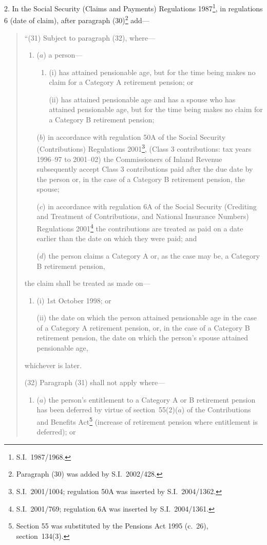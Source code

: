\documentclass[12pt,a4paper]{article}
\begin{document}
2.  In the Social Security (Claims and Payments) Regulations 1987\footnote{S.I.~1987/1968.}, in regulations 6 (date of claim), after paragraph (30)\footnote{Paragraph (30) was added by S.I.~2002/428.} add—
\begin{quotation}
“(31) Subject to paragraph (32), where—
\begin{enumerate}\item[]
($a$) a person—
\begin{enumerate}\item[]
(i) has attained pensionable age, but for the time being makes no claim for a Category A retirement pension; or

(ii) has attained pensionable age and has a spouse who has attained pensionable age, but for the time being makes no claim for a Category B retirement pension;
\end{enumerate}

($b$) in accordance with regulation 50A of the Social Security (Contributions) Regulations 2001\footnote{S.I.~2001/1004; regulation 50A was inserted by S.I.~2004/1362.}, (Class 3 contributions: tax years 1996--97 to 2001--02) the Commissioners of Inland Revenue subsequently accept Class 3 contributions paid after the due date by the person or, in the case of a Category B retirement pension, the spouse;

($c$) in accordance with regulation 6A of the Social Security (Crediting and Treatment of Contributions, and National Insurance Numbers) Regulations 2001\footnote{S.I.~2001/769; regulation 6A was inserted by S.I.~2004/1361.} the contributions are treated as paid on a date earlier than the date on which they were paid; and

($d$) the person claims a Category A or, as the case may be, a Category B retirement pension,
\end{enumerate}
the claim shall be treated as made on—
\begin{enumerate}\item[]
(i) 1st October 1998; or

(ii) the date on which the person attained pensionable age in the case of a Category A retirement pension, or, in the case of a Category B retirement pension, the date on which the person’s spouse attained pensionable age,
\end{enumerate}
whichever is later.

(32) Paragraph (31) shall not apply where—
\begin{enumerate}\item[]
($a$) the person’s entitlement to a Category A or B retirement pension has been deferred by virtue of section~55(2)($a$)  of the Contributions and Benefits Act\footnote{Section 55 was substituted by the Pensions Act 1995 (c.~26), section~134(3).} (increase of retirement pension where entitlement is deferred); or


\end{enumerate}
\end{quotation}
\end{document}
